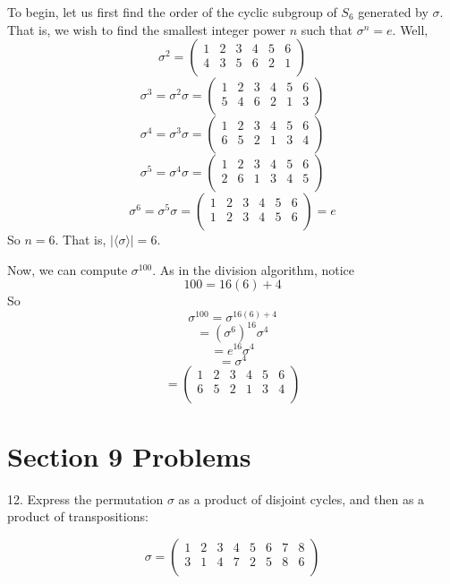 \documentclass{article}
\begin{document}
To begin, let us first find the order of the cyclic subgroup of $S_6$ generated by $\sigma$. That is, we wish to find the smallest integer power $n$ such that $\sigma^n = e$. Well,
\[\sigma^2 = \begin{pmatrix}
    1 & 2 & 3 & 4 & 5 & 6\\
    4 & 3 & 5 & 6 & 2 & 1\\
\end{pmatrix}\]
\[\sigma^3 = \sigma^2\sigma = \begin{pmatrix}
    1 & 2 & 3 & 4 & 5 & 6\\
    5 & 4 & 6 & 2 & 1 & 3\\
\end{pmatrix}\]
\[\sigma^4 = \sigma^3\sigma = \begin{pmatrix}
    1 & 2 & 3 & 4 & 5 & 6\\
    6 & 5 & 2 & 1 & 3 & 4\\
\end{pmatrix}\]
\[\sigma^5 = \sigma^4\sigma = \begin{pmatrix}
    1 & 2 & 3 & 4 & 5 & 6\\
    2 & 6 & 1 & 3 & 4 & 5\\
\end{pmatrix}\]
\[\sigma^6 = \sigma^5\sigma = \begin{pmatrix}
    1 & 2 & 3 & 4 & 5 & 6\\
    1 & 2 & 3 & 4 & 5 & 6\\
\end{pmatrix} = e\]
So $n = 6$. That is, $|\langle \sigma \rangle| = 6$.

Now, we can compute $\sigma^{100}$. As in the division algorithm, notice 
\[100 = 16(6) + 4\]
So 
\[\sigma^{100} = \sigma^{16(6) + 4}\]
\[ = (\sigma^{6})^{16}\sigma^4\]
\[ = e^{16}\sigma^4\]
\[ = \sigma^4\]
\[ = \begin{pmatrix}
    1 & 2 & 3 & 4 & 5 & 6\\
    6 & 5 & 2 & 1 & 3 & 4\\
\end{pmatrix}\]


\section*{Section 9 Problems}

12. Express the permutation $\sigma$ as a product of disjoint cycles, and then as a product of transpositions:

\[\sigma = \begin{pmatrix}
    1 & 2 & 3 & 4 & 5 & 6 & 7 & 8\\
    3 & 1 & 4 & 7 & 2 & 5 & 8 & 6\\
\end{pmatrix}\]
\end{document}
